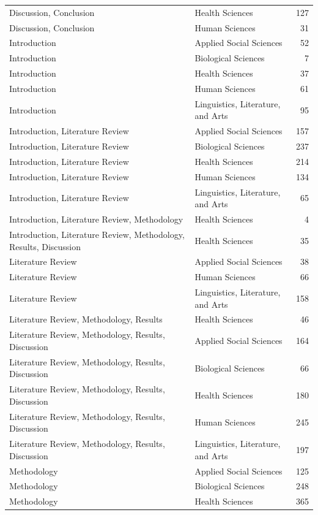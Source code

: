 \begin{longtable}{llr}
Discussion, Conclusion & Health Sciences & 127 \\
Discussion, Conclusion & Human Sciences & 31 \\
Introduction & Applied Social Sciences & 52 \\
Introduction & Biological Sciences & 7 \\
Introduction & Health Sciences & 37 \\
Introduction & Human Sciences & 61 \\
Introduction & Linguistics, Literature, and Arts & 95 \\
Introduction, Literature Review & Applied Social Sciences & 157 \\
Introduction, Literature Review & Biological Sciences & 237 \\
Introduction, Literature Review & Health Sciences & 214 \\
Introduction, Literature Review & Human Sciences & 134 \\
Introduction, Literature Review & Linguistics, Literature, and Arts & 65 \\
Introduction, Literature Review, Methodology & Health Sciences & 4 \\
Introduction, Literature Review, Methodology, Results, Discussion & Health Sciences & 35 \\
Literature Review & Applied Social Sciences & 38 \\
Literature Review & Human Sciences & 66 \\
Literature Review & Linguistics, Literature, and Arts & 158 \\
Literature Review, Methodology, Results & Health Sciences & 46 \\
Literature Review, Methodology, Results, Discussion & Applied Social Sciences & 164 \\
Literature Review, Methodology, Results, Discussion & Biological Sciences & 66 \\
Literature Review, Methodology, Results, Discussion & Health Sciences & 180 \\
Literature Review, Methodology, Results, Discussion & Human Sciences & 245 \\
Literature Review, Methodology, Results, Discussion & Linguistics, Literature, and Arts & 197 \\
Methodology & Applied Social Sciences & 125 \\
Methodology & Biological Sciences & 248 \\
Methodology & Health Sciences & 365 \\

\end{longtable}
